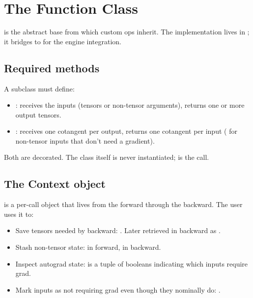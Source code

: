 \section{The Function Class}
\label{sec:custom_functions:function_class}

 is the abstract base from which
custom ops inherit. The implementation lives in
; it bridges to
 for the engine
integration.

\subsection{Required methods}
\label{ssec:custom_functions:required}

A subclass must define:

\begin{itemize}
  \item {}: receives the inputs (tensors
    or non-tensor arguments), returns one or more output tensors.
  \item {}: receives one
    cotangent per output, returns one cotangent per input
    ( for non-tensor inputs that don't need a
    gradient).
\end{itemize}

Both are  decorated. The class itself is never
instantiated;  is the call.

\subsection{The Context object}
\label{ssec:custom_functions:context}

 is a per-call object that lives from the forward
through the backward. The user uses it to:

\begin{itemize}
  \item Save tensors needed by backward:
    . Later retrieved
    in backward as .
  \item Stash non-tensor state:  in
    forward,  in backward.
  \item Inspect autograd state:  is
    a tuple of booleans indicating which inputs require grad.
  \item Mark inputs as not requiring grad even though they
    nominally do: .
\end{itemize}

